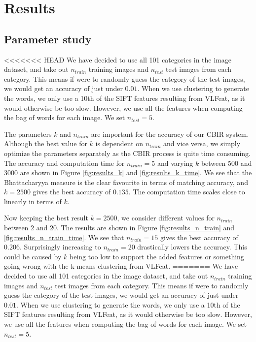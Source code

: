\documentclass[11pt,a4paper]{article}
\begin{document}
\section{Results}

\subsection{Parameter study}

<<<<<<< HEAD
We have decided to use all 101 categories in the image dataset, and take out
$n_{train}$ training images and $n_{test}$ test images from each category.
This means if were to randomly guess the category of the test images, we would
get an accuracy of just under $0.01$. When we use clustering to generate the
words, we only use a 10th of the SIFT features resulting from VLFeat, as it
would otherwise be too slow. However, we use all the features when computing
the bag of words for each image. We set $n_{test} = 5$.

The parameters $k$ and $n_{train}$ are important for the accuracy of our
CBIR system. Although the best value for $k$ is dependent on $n_{train}$
and vice versa, we simply optimize the parameters separately as the CBIR
process is quite time consuming. The accuracy and computation time for
$n_{train} = 5$ and varying $k$ between $500$ and $3000$ are shown in
Figure \ref{fig:results_k} and \ref{fig:results_k_time}. We see that the
Bhattacharyya measure is the clear favourite in terms of matching accuracy,
and $k = 2500$ gives the best accuracy of $0.135$. The computation time scales
close to linearly in terms of $k$.

Now keeping the best result $k = 2500$, we consider different values
for $n_{train}$ between $2$ and $20$. The results are shown in Figure
\ref{fig:results_n_train} and \ref{fig:results_n_train_time}. We see that
$n_{train} = 15$ gives the best accuracy of $0.206$. Surprisingly increasing
to $n_{train} = 20$ drastically lowers the accuracy. This could be caused by
$k$ being too low to support the added features or something going wrong with
the k-means clustering from VLFeat.
=======
We have decided to use all 101 categories in the image dataset, and take out $n_{train}$ training images and $n_{test}$ test images from each category. This means if were to randomly guess the category of the test images, we would get an accuracy of just under $0.01$. When we use clustering to generate the words, we only use a 10th of the SIFT features resulting from VLFeat, as it would otherwise be too slow. However, we use all the features when computing the bag of words for each image. We set $n_{test} = 5$.
\end{document}
